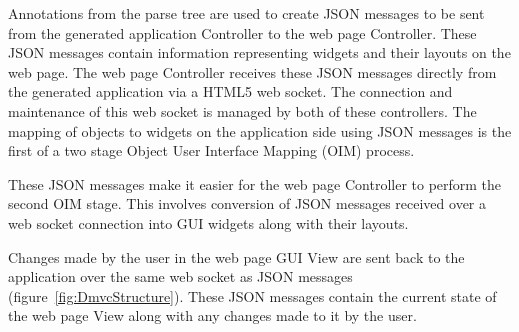 \indent
Annotations from the parse tree are used to create JSON messages to be sent from the generated application Controller to the web page Controller.  These JSON messages contain information representing widgets and their layouts on the web page.  The web page Controller receives these JSON messages directly from the generated application via a HTML5 web socket.  The connection and maintenance of this web socket is managed by both of these controllers.  The mapping of objects to widgets on the application side using JSON messages is the first of a two stage Object User Interface Mapping (OIM) process.

\indent
These JSON messages make it easier for the web page Controller to perform the second OIM stage.  This involves conversion of JSON messages received over a web socket connection into GUI widgets along with their layouts.

\indent
Changes made by the user in the web page GUI View are sent back to the application over the same web socket as JSON messages (figure~\ref{fig:DmvcStructure}).  These JSON messages contain the current state of the web page View along with any changes made to it by the user.
